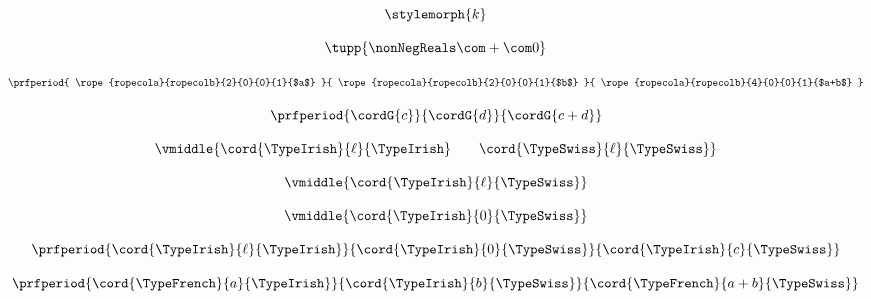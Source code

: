 {\begin{forslides}
        \begin{equation}
            \label{eq:semicats-slides-52}
            \stylemorph{k}
        \end{equation}

        \begin{equation}
            \label{eq:semicats-slides-53a}
            \tupp{\nonNegReals \com + \com 0}
        \end{equation}

        \begin{equation}
            \label{eq:semicats-slides-53b}
            \prfperiod{
                \rope{ropecola}{ropecolb}{2}{0}{0}{1}{$a$}
            }{
                \rope{ropecola}{ropecolb}{2}{0}{0}{1}{$b$}
            }{
                \rope{ropecola}{ropecolb}{4}{0}{0}{1}{$a+b$}
            }
        \end{equation}

        \begin{equation}
            \label{eq:semicats-slides-54}
            \prfperiod{
                \cordG{c}
            }{
                \cordG{d}
            }{
                \cordG{c+d}
            }
        \end{equation}

        \begin{equation}
            \label{eq:semicats-slides-55}
            \vmiddle{\cord{\TypeIrish}{\ell}{\TypeIrish} \qquad \cord{\TypeSwiss}{\ell}{\TypeSwiss}}
        \end{equation}

        \begin{equation}
            \label{eq:semicats-slides-56}
            \vmiddle{\cord{\TypeIrish}{\ell}{\TypeSwiss}}
        \end{equation}

        \begin{equation}
            \label{eq:semicats-slides-57}
            \vmiddle{\cord{\TypeIrish}{0}{\TypeSwiss}}
        \end{equation}

        \begin{equation}
            \label{eq:semicats-slides-58a}
            \prfperiod{
                \cord{\TypeIrish}{\ell}{\TypeIrish}
            }{
                \cord{\TypeIrish}{0}{\TypeSwiss}
            }{
                \cord{\TypeIrish}{c}{\TypeSwiss}
            }
        \end{equation}

        \begin{equation}
            \label{eq:semicats-slides-58b}
            \prfperiod{
                \cord{\TypeFrench}{a}{\TypeIrish}
            }{
                \cord{\TypeIrish}{b}{\TypeSwiss}
            }{
                \cord{\TypeFrench}{a + b}{\TypeSwiss}
            }
        \end{equation}


\end{forslides}}
